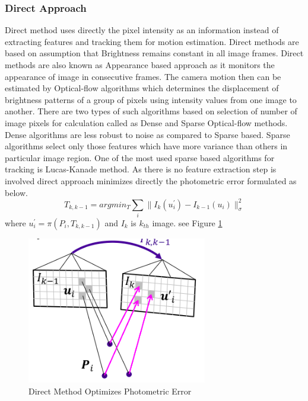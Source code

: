 \subsubsection{Direct Approach}
\label{direct}
Direct method uses directly the pixel intensity as an information instead of extracting features and tracking them for motion estimation. Direct methods are based on assumption that Brightness remains constant in all image frames.\cite{Irani-et-al-1999} Direct methods are also known as Appearance based approach as it monitors the appearance of image in consecutive frames. The camera motion then can be estimated by Optical-flow algorithms which determines the displacement of brightness patterns of a group of pixels using intensity values from one image to another.\cite{Aqel-et-al-2016} There are two types of such algorithms based on selection of number of image pixels for calculation called as Dense and Sparse Optical-flow methods. Dense algorithms are less robust to noise as compared to Sparse based. Sparse algorithms select only those features which have more variance than others in particular image region. One of the most used sparse based algorithms for tracking is Lucas-Kanade method.\cite{Lucas81} As there is no feature extraction step is involved direct approach minimizes directly the photometric error formulated as below. 
\begin{equation*}
	T_{k,k-1} = arg min_{T} \sum_{i} \| I_{k}(u^{'}_{i})- I_{k-1}(u_{i})\|^{2}_{\sigma}
\end{equation*}
where   $u^{'}_{i} = \pi (P_{i},T_{k,k-1})$ and $I_{k} $ is  $k_{th}$ image. see Figure \ref{fig:direct}
\newline
\begin{figure}[h]
	\centering
	\includegraphics[width=0.7\textwidth]{direct}
	\caption{Direct Method Optimizes Photometric Error}
	\label{fig:direct}
\end{figure}
